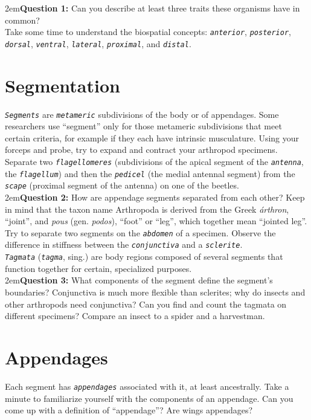 \documentclass[letterpaper, 11pt]{article}
\newcommand{\latinword}[1]{\texttt{\itshape #1}}%
\begin{document}
\hangindent2em\textbf{Question 1:} Can you describe at least three traits these organisms have in common?\\

\noindent{}Take some time to understand the biospatial concepts: \latinword{anterior}, \latinword{posterior}, \latinword{dorsal}, \latinword{ventral}, \latinword{lateral}, \latinword{proximal}, and \latinword{distal}.

\section{Segmentation}
\latinword{Segments} are \latinword{metameric} subdivisions of the body or of appendages. Some researchers use ``segment'' only for those metameric subdivisions that meet certain criteria, for example if they each have intrinsic musculature. Using your forceps and probe, try to expand and contract your arthropod specimens. Separate two \latinword{flagellomeres} (subdivisions of the apical segment of the \latinword{antenna}, the \latinword{flagellum}) and then the \latinword{pedicel} (the medial antennal segment) from the \latinword{scape} (proximal segment of the antenna) on one of the beetles.\\

\hangindent2em\textbf{Question 2:} How are appendage segments separated from each other? Keep in mind that the taxon name Arthropoda is derived from the Greek \textit{árthron}, ``joint'', and \textit{pous} (gen. \textit{podos}), ``foot'' or ``leg'', which together mean ``jointed leg''. \\

\noindent{}Try to separate two segments on the \latinword{abdomen} of a specimen. Observe the difference in stiffness between the \latinword{conjunctiva} and a \latinword{sclerite}. \\

\noindent{}\latinword{Tagmata} (\latinword{tagma}, sing.) are body regions composed of several segments that function together for certain, specialized purposes. \\

\hangindent2em\textbf{Question 3:} What components of the segment define the segment's boundaries? Conjunctiva is much more flexible than sclerites; why do insects and other arthropods need conjunctiva? Can you find and count the tagmata on different specimens? Compare an insect to a spider and a harvestman.\\

\section{Appendages}
Each segment has \latinword{appendages} associated with it, at least ancestrally. Take a minute to familiarize yourself with the components of an appendage. Can you come up with a definition of ``appendage''? Are wings appendages?\\
\end{document}
